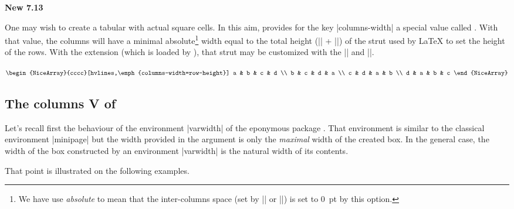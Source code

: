 \documentclass[dvipsnames]{article}
\begin{document}
\bigskip
\colorbox{yellow!50}{\bfseries New 7.13}

\smallskip
\nobreak
{}
One may wish to create a tabular with actual square cells. In this aim, 
provides for the key |columns-width| a special value called .
With that value, the columns will have a minimal absolute\footnote{We have use \emph{absolute} to mean that the inter-columns space (set by |\arraycolsep| or |\tabcolsep|) is set to $0$~pt by this option.} width equal to the total height
(|\dp| + |\ht|) of the strut used by LaTeX to set the height of the rows. With the
extension  (which is loaded by ), that strut may be customized
with the |\arraystretch| and |\extrarowheight|.

\medskip
\begin{Code}[width=12cm,show-output]
\renewcommand{\arraystretch}{1.5}
$\begin{NiceArray}{cccc}[hvlines,\emph{columns-width=row-height}]
a & b & c & d \\
b & c & d & a \\
c & d & a & b \\
d & a & b & c
\end{NiceArray}$
\end{Code}


\subsection{The columns V of \texorpdfstring{}{varwidth}}

\label{varwidth}


Let's recall first the behaviour of the environment |{varwidth}| of the
eponymous package . That environment is similar to the classical
environment |{minipage}| but the width provided in the argument is only the
\emph{maximal} width of the created box. In the general case, the width of the
box constructed by an environment |{varwidth}| is the natural width of its
contents.

\medskip
That point is illustrated on the following examples.

\medskip
\begin{Code}[width=6cm,show-output]
\end{Code}
\end{document}
